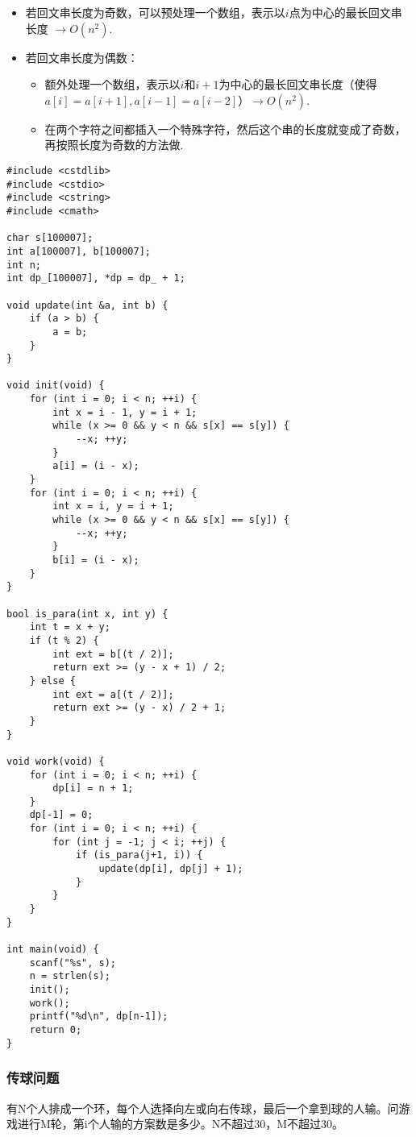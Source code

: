 \begin{itemize}
    \item{若回文串长度为奇数，可以预处理一个数组，表示以$i$点为中心的最长回文串长度 $\to O(n^2)$.}
    \item{若回文串长度为偶数：}
    \begin{itemize}
        \item{额外处理一个数组，表示以$i$和$i+1$为中心的最长回文串长度（使得$a[i]=a[i+1],a[i-1]=a[i-2]$）$\to O(n^2)$.}
        \item{在两个字符之间都插入一个特殊字符，然后这个串的长度就变成了奇数，再按照长度为奇数的方法做.}
    \end{itemize}
\end{itemize}
\begin{verbatim}
#include <cstdlib>
#include <cstdio>
#include <cstring>
#include <cmath>

char s[100007];
int a[100007], b[100007];
int n;
int dp_[100007], *dp = dp_ + 1;

void update(int &a, int b) {
    if (a > b) {
        a = b;
    }
}

void init(void) {
    for (int i = 0; i < n; ++i) {
        int x = i - 1, y = i + 1;
        while (x >= 0 && y < n && s[x] == s[y]) {
            --x; ++y;
        }
        a[i] = (i - x);
    }
    for (int i = 0; i < n; ++i) {
        int x = i, y = i + 1;
        while (x >= 0 && y < n && s[x] == s[y]) {
            --x; ++y;
        }
        b[i] = (i - x);
    }
}

bool is_para(int x, int y) {
    int t = x + y;
    if (t % 2) {
        int ext = b[(t / 2)];
        return ext >= (y - x + 1) / 2;
    } else {
        int ext = a[(t / 2)];
        return ext >= (y - x) / 2 + 1;
    }
}

void work(void) {
    for (int i = 0; i < n; ++i) {
        dp[i] = n + 1;
    }
    dp[-1] = 0;
    for (int i = 0; i < n; ++i) {
        for (int j = -1; j < i; ++j) {
            if (is_para(j+1, i)) {
                update(dp[i], dp[j] + 1);
            }
        }
    }
}

int main(void) {
    scanf("%s", s);
    n = strlen(s);
    init();
    work();
    printf("%d\n", dp[n-1]);
    return 0;
}
\end{verbatim}
\subsubsection{传球问题}
有N个人排成一个环，每个人选择向左或向右传球，最后一个拿到球的人输。问游戏进行M轮，第i个人输的方案数是多少。N不超过30，M不超过30。

